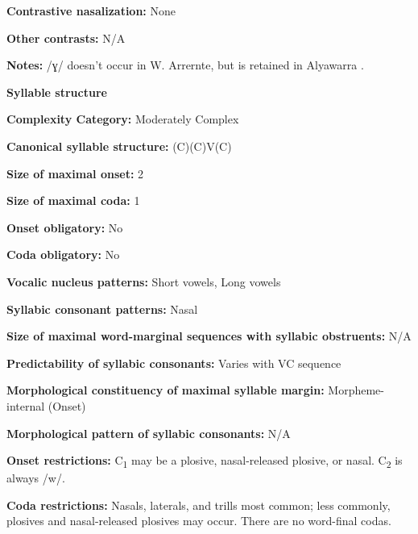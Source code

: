 \textbf{Contrastive nasalization:} None



\textbf{Other contrasts:} N/A



\textbf{Notes:} /ɣ/ doesn’t occur in W. Arrernte, but is retained in Alyawarra \citep[12]{Yallop1977}.



\textbf{Syllable structure}



\textbf{Complexity Category:} Moderately Complex



\textbf{Canonical syllable structure:} (C)(C)V(C) \citep[41-5]{Yallop1977}



\textbf{Size of maximal onset:} 2



\textbf{Size of maximal coda:} 1



\textbf{Onset obligatory:} No



\textbf{Coda obligatory:} No



\textbf{Vocalic nucleus patterns:} Short vowels, Long vowels



\textbf{Syllabic consonant patterns:} Nasal



\textbf{Size of maximal word{}-marginal sequences with syllabic obstruents:} N/A



\textbf{Predictability of syllabic consonants:} Varies with VC sequence



\textbf{Morphological constituency of maximal syllable margin:} Morpheme-internal (Onset)



\textbf{Morphological pattern of syllabic consonants:} N/A



\textbf{Onset restrictions:} C\textsubscript{1} may be a plosive, nasal-released plosive, or nasal. C\textsubscript{2} is always /w/.



\textbf{Coda restrictions:} Nasals, laterals, and trills most common; less commonly, plosives and nasal-released plosives may occur. There are no word-final codas.



